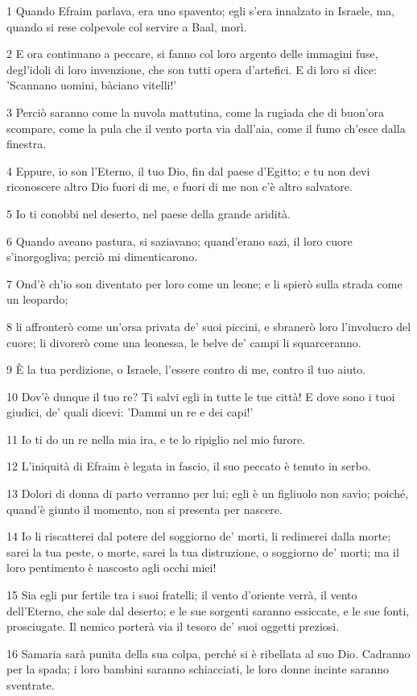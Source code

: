 \par 1 Quando Efraim parlava, era uno spavento; egli s'era innalzato in Israele, ma, quando si rese colpevole col servire a Baal, morì.
\par 2 E ora continuano a peccare, si fanno col loro argento delle immagini fuse, degl'idoli di loro invenzione, che son tutti opera d'artefici. E di loro si dice: 'Scannano uomini, bàciano vitelli!'
\par 3 Perciò saranno come la nuvola mattutina, come la rugiada che di buon'ora scompare, come la pula che il vento porta via dall'aia, come il fumo ch'esce dalla finestra.
\par 4 Eppure, io son l'Eterno, il tuo Dio, fin dal paese d'Egitto; e tu non devi riconoscere altro Dio fuori di me, e fuori di me non c'è altro salvatore.
\par 5 Io ti conobbi nel deserto, nel paese della grande aridità.
\par 6 Quando aveano pastura, si saziavano; quand'erano sazi, il loro cuore s'inorgogliva; perciò mi dimenticarono.
\par 7 Ond'è ch'io son diventato per loro come un leone; e li spierò sulla strada come un leopardo;
\par 8 li affronterò come un'orsa privata de' suoi piccini, e sbranerò loro l'involucro del cuore; li divorerò come una leonessa, le belve de' campi li squarceranno.
\par 9 È la tua perdizione, o Israele, l'essere contro di me, contro il tuo aiuto.
\par 10 Dov'è dunque il tuo re? Ti salvi egli in tutte le tue città! E dove sono i tuoi giudici, de' quali dicevi: 'Dammi un re e dei capi!'
\par 11 Io ti do un re nella mia ira, e te lo ripiglio nel mio furore.
\par 12 L'iniquità di Efraim è legata in fascio, il suo peccato è tenuto in serbo.
\par 13 Dolori di donna di parto verranno per lui; egli è un figliuolo non savio; poiché, quand'è giunto il momento, non si presenta per nascere.
\par 14 Io li riscatterei dal potere del soggiorno de' morti, li redimerei dalla morte; sarei la tua peste, o morte, sarei la tua distruzione, o soggiorno de' morti; ma il loro pentimento è nascosto agli occhi miei!
\par 15 Sia egli pur fertile tra i suoi fratelli; il vento d'oriente verrà, il vento dell'Eterno, che sale dal deserto; e le sue sorgenti saranno essiccate, e le sue fonti, prosciugate. Il nemico porterà via il tesoro de' suoi oggetti preziosi.
\par 16 Samaria sarà punita della sua colpa, perché si è ribellata al suo Dio. Cadranno per la spada; i loro bambini saranno schiacciati, le loro donne incinte saranno sventrate.

